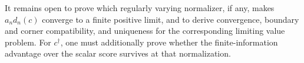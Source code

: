 It remains open to prove which regularly varying normalizer, if any, makes \(a_nd_n(c)\) converge to a finite positive limit, and to derive convergence, boundary and corner compatibility, and uniqueness for the corresponding limiting value problem.  For \(c^\dagger\), one must additionally prove whether the finite-information advantage over the scalar score survives at that normalization.